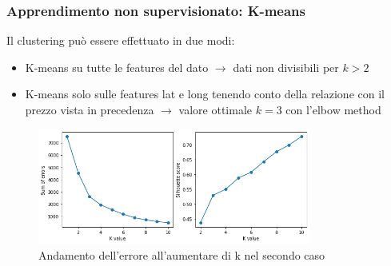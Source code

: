 \documentclass{beamer}
\begin{document}
\begin{frame}
	\frametitle{Apprendimento non supervisionato: K-means}
	Il clustering può essere effettuato in due modi:
	\begin{itemize}
		\item K-means su tutte le features del dato $\rightarrow$ dati non 
			divisibili per $k > 2$
		\item K-means solo sulle features \alert{lat} e \alert{long} tenendo
			conto della relazione con il prezzo vista in precedenza
			$\rightarrow$ valore ottimale $k = 3$ con l'elbow method
	\end{itemize}
	\begin{figure}
		\centering
		\includegraphics[width=0.8\textwidth]{kselection2.png}
		\caption{Andamento dell'errore all'aumentare di k nel secondo caso}
	\end{figure}
\end{frame}
\end{document}
